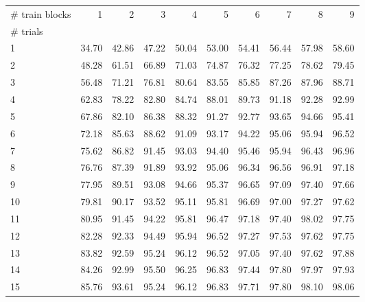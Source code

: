 \begin{tabularx}{\textwidth}{@{}Xrrrrrrrrr@{}}
\toprule
\# train blocks & 1 & 2 & 3 & 4 & 5 & 6 & 7 & 8 & 9 \\
\# trials &  &  &  &  &  &  &  &  &  \\
\midrule
1 & 34.70 & 42.86 & 47.22 & 50.04 & 53.00 & 54.41 & 56.44 & 57.98 & 58.60 \\
2 & 48.28 & 61.51 & 66.89 & 71.03 & 74.87 & 76.32 & 77.25 & 78.62 & 79.45 \\
3 & 56.48 & 71.21 & 76.81 & 80.64 & 83.55 & 85.85 & 87.26 & 87.96 & 88.71 \\
4 & 62.83 & 78.22 & 82.80 & 84.74 & 88.01 & 89.73 & 91.18 & 92.28 & 92.99 \\
5 & 67.86 & 82.10 & 86.38 & 88.32 & 91.27 & 92.77 & 93.65 & 94.66 & 95.41 \\
6 & 72.18 & 85.63 & 88.62 & 91.09 & 93.17 & 94.22 & 95.06 & 95.94 & 96.52 \\
7 & 75.62 & 86.82 & 91.45 & 93.03 & 94.40 & 95.46 & 95.94 & 96.43 & 96.96 \\
8 & 76.76 & 87.39 & 91.89 & 93.92 & 95.06 & 96.34 & 96.56 & 96.91 & 97.18 \\
9 & 77.95 & 89.51 & 93.08 & 94.66 & 95.37 & 96.65 & 97.09 & 97.40 & 97.66 \\
10 & 79.81 & 90.17 & 93.52 & 95.11 & 95.81 & 96.69 & 97.00 & 97.27 & 97.62 \\
11 & 80.95 & 91.45 & 94.22 & 95.81 & 96.47 & 97.18 & 97.40 & 98.02 & 97.75 \\
12 & 82.28 & 92.33 & 94.49 & 95.94 & 96.52 & 97.27 & 97.53 & 97.62 & 97.75 \\
13 & 83.82 & 92.59 & 95.24 & 96.12 & 96.52 & 97.05 & 97.40 & 97.62 & 97.88 \\
14 & 84.26 & 92.99 & 95.50 & 96.25 & 96.83 & 97.44 & 97.80 & 97.97 & 97.93 \\
15 & 85.76 & 93.61 & 95.24 & 96.12 & 96.83 & 97.71 & 97.80 & 98.10 & 98.06 \\
\bottomrule
\end{tabularx}
